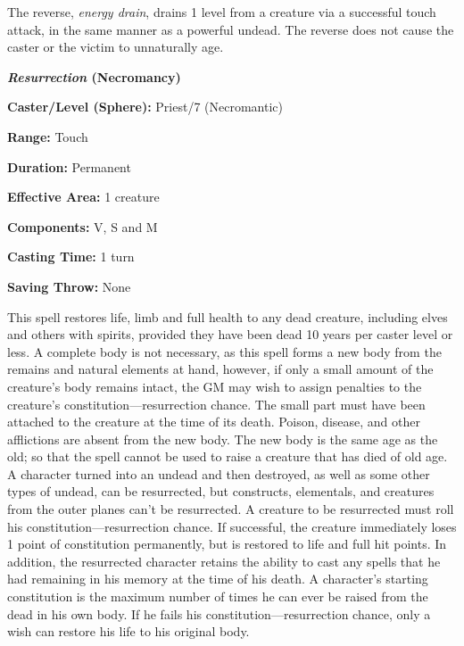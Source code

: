 \begin{multicols}{2}
The reverse, \textit{energy drain}, drains 1 level from a creature via a successful touch attack, in the same manner as a powerful undead.  The reverse does not cause the caster or the victim to unnaturally age.

\vspace{1em}

\noindent
\begin{minipage}{\columnwidth}

\noindent \textbf{\textit{Resurrection} (Necromancy)}

\noindent \textbf{Caster/Level (Sphere):} Priest/7 (Necromantic)

\noindent \textbf{Range:} Touch

\noindent \textbf{Duration:} Permanent

\noindent \textbf{Effective Area:} 1 creature

\noindent \textbf{Components:} V, S and M

\noindent \textbf{Casting Time:} 1 turn

\noindent \textbf{Saving Throw:} None

\end{minipage}

This spell restores life, limb and full health to any dead creature, including elves and others with spirits, provided they have been dead 10 years per caster level or less.  A complete body is not necessary, as this spell forms a new body from the remains and natural elements at hand, however, if only a small amount of the creature's body remains intact, the GM may wish to assign penalties to the creature's constitution---resurrection chance.  The small part must have been attached to the creature at the time of its death.  Poison, disease, and other afflictions are absent from the new body.  The new body is the same age as the old; so that the spell cannot be used to raise a creature that has died of old age.  A character turned into an undead and then destroyed, as well as some other types of undead, can be resurrected, but constructs, elementals, and creatures from the outer planes can't be resurrected.  A creature to be resurrected must roll his constitution---resurrection chance.  If successful, the creature immediately loses 1 point of constitution permanently, but is restored to life and full hit points.  In addition, the resurrected character retains the ability to cast any spells that he had remaining in his memory at the time of his death.  A character's starting constitution is the maximum number of times he can ever be raised from the dead in his own body.  If he fails his constitution---resurrection chance, only a wish can restore his life to his original body.


\end{multicols}
